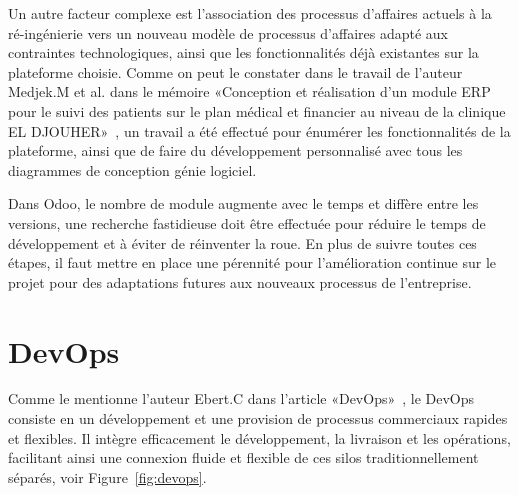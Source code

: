 Un autre facteur complexe est l'association des processus d'affaires actuels à la ré-ingénierie vers un nouveau modèle de processus d'affaires adapté aux contraintes technologiques, ainsi que les fonctionnalités déjà existantes sur la plateforme choisie. Comme on peut le constater dans le travail de l'auteur Medjek.M et al. dans le mémoire «Conception et réalisation d’un module ERP pour le suivi des patients sur le plan médical et financier au niveau de la clinique EL DJOUHER»~\cite{kenza2018conception}, un travail a été effectué pour énumérer les fonctionnalités de la plateforme, ainsi que de faire du développement personnalisé avec tous les diagrammes de conception génie logiciel.

Dans Odoo, le nombre de module augmente avec le temps et diffère entre les versions, une recherche fastidieuse doit être effectuée pour réduire le temps de développement et à éviter de réinventer la roue. En plus de suivre toutes ces étapes, il faut mettre en place une pérennité pour l’amélioration continue sur le projet pour des adaptations futures aux nouveaux processus de l'entreprise.






\section{DevOps}\label{devops_ref}

Comme le mentionne l'auteur Ebert.C dans l'article «DevOps»~\cite{ebert2016devops}, le DevOps consiste en un développement et une provision de processus commerciaux rapides et flexibles. Il intègre efficacement le développement, la livraison et les opérations, facilitant ainsi une connexion fluide et flexible de ces silos traditionnellement séparés, voir Figure~\ref{fig:devops}.

